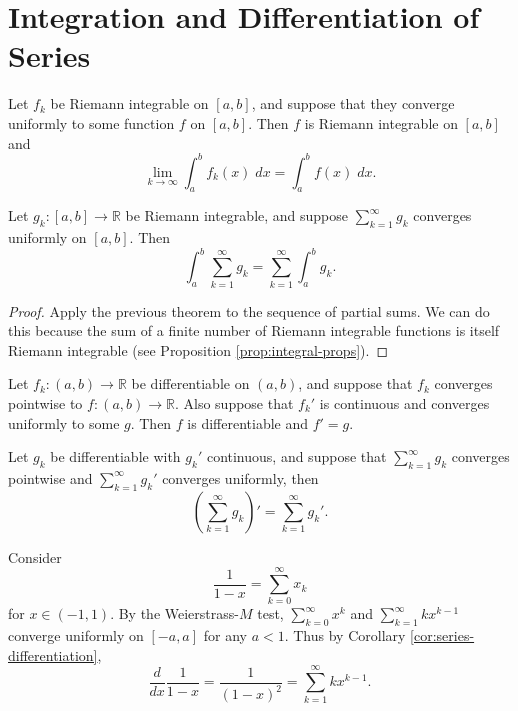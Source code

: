 \documentclass[10pt]{report}
\begin{document}
\section{Integration and Differentiation of Series}

\begin{thrm}[]
	Let $f_k$ be Riemann integrable on $[a,b] $, and suppose that they converge uniformly to some function $f$ on $[a,b]$. Then $f$ is Riemann integrable on $[a,b]$ and
	\[
		\lim_{k \to \infty} \int_{a}^{b} f_k(x) \;dx = \int_{a}^{b} f(x)\;dx.
	\] 
\end{thrm}

\pagebreak

\begin{cor}
	Let $g_k : [a,b] \to \mathbb{R}$ be Riemann integrable, and suppose $\sum_{k=1}^{\infty} g_k$ converges uniformly on $[a,b]$. Then
	\[
		\int_{a}^{b} \sum_{k=1}^{\infty} g_k = \sum_{k=1}^{\infty} \int_{a}^{b} g_k.
	\] 
\end{cor}
\begin{proof}
	Apply the previous theorem to the sequence of partial sums. We can do this because the sum of a finite number of Riemann integrable functions is itself Riemann integrable (see Proposition \ref{prop:integral-props}).
\end{proof}

\begin{thrm}{}{}
	Let $f_k:(a,b) \to \mathbb{R}$ be differentiable on $(a,b)$, and suppose that $f_k$ converges pointwise to $f:(a,b) \to \mathbb{R}$. Also suppose that $f_k'$ is continuous and converges uniformly to some $g$. Then $f$ is differentiable and $f'=g$.
\end{thrm}

\begin{cor}
	\label{cor:series-differentiation}
	Let $g_k$ be differentiable with $g_k'$ continuous, and suppose that $\sum_{k=1}^{\infty} g_k$ converges pointwise and $\sum_{k=1}^{\infty} g_k'$ converges uniformly, then
	\[
		\left( \sum_{k=1}^{\infty} g_k \right)' = \sum_{k=1}^{\infty} g_k'.
	\] 
\end{cor}

\begin{ex}{}{}
	Consider \[ \frac{1}{1-x} = \sum_{k=0}^{\infty} x_k\] for $x \in (-1, 1)$. By the Weierstrass-$M$ test, $\sum_{k=0}^{\infty} x^k$ and $\sum_{k=1}^{\infty} k x^{k-1}$ converge uniformly on $[-a,a]$ for any $a <1$. Thus by Corollary \ref{cor:series-differentiation},
	\[
		\frac{d }{d x} \frac{1}{1-x} = \frac{1}{(1-x)^2} = \sum_{k=1}^{\infty} k x^{k-1}.
	\] 
\end{ex}
\end{document}
